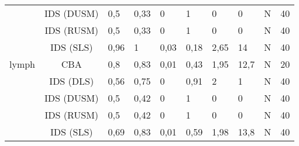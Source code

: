 \begin{tabular}{ccllllllll}
      & IDS (DUSM) &                0,5 &                            0,33 &                               0 &                                 1 &                                 0 &                             0 &                            N &                         40 \\
      & IDS (RUSM) &                0,5 &                            0,33 &                               0 &                                 1 &                                 0 &                             0 &                            N &                         40 \\
      & IDS (SLS) &               0,96 &                               1 &                            0,03 &                              0,18 &                              2,65 &                            14 &                            N &                         40 \\
lymph & CBA &                0,8 &                            0,83 &                            0,01 &                              0,43 &                              1,95 &                          12,7 &                            N &                         20 \\
      & IDS (DLS) &               0,56 &                            0,75 &                               0 &                              0,91 &                                 2 &                             1 &                            N &                         40 \\
      & IDS (DUSM) &                0,5 &                            0,42 &                               0 &                                 1 &                                 0 &                             0 &                            N &                         40 \\
      & IDS (RUSM) &                0,5 &                            0,42 &                               0 &                                 1 &                                 0 &                             0 &                            N &                         40 \\
      & IDS (SLS) &               0,69 &                            0,83 &                            0,01 &                              0,59 &                              1,98 &                          13,8 &                            N &                         40 \\
\bottomrule
\end{tabular}
